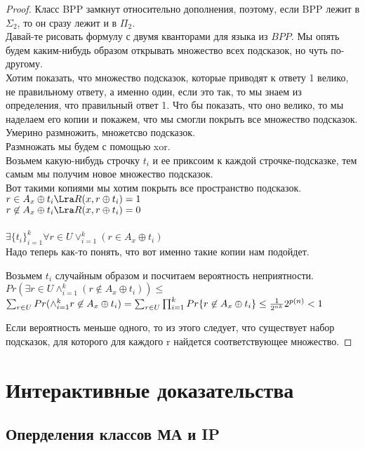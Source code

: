 \begin{proof}
	Класс BPP замкнут относительно дополнения, поэтому, если BPP лежит в $\Sigma_2$, то он сразу лежит и в $\Pi_2$.
	\\
	Давай-те рисовать формулу с двумя кванторами для языка из $BPP$. Мы опять будем каким-нибудь образом 
	открывать множество всех подсказок, но чуть по-другому. 
	\\
	Хотим показать, что множество подсказок, которые приводят к ответу 1 велико, не правильному ответу, а именно один, если это так, 
	то мы знаем из определения, что правильный ответ 1. 
	Что бы показать, что оно велико, то мы наделаем его копии и покажем, что мы смогли покрыть все множество подсказок. 
	Умерино размножить,  множетсво подсказок. 
	\\
	Размножать мы будем с помощью xor.
	\\
	Возьмем какую-нибудь строчку $t_i$ и ее приксоим к каждой строчке-подсказке, тем самым мы получим новое множество подсказок.
        \\
	Вот такими копиями мы хотим покрыть все пространство подсказок.\\
	$r \in A_x \oplus t_i \Lra R(x, r \oplus t_i) = 1$ \\
	$r \not \in A_x \oplus t_i \Lra R(x, r \oplus t_i) = 0$\\
	\\
	$\exists\{t_i\}_{i = 1}^{k} \forall r \in U \vee_{i = 1}^{k}(r \in A_x \oplus t_i)$ \\

	Надо теперь как-то понять, что вот именно такие копии нам подойдет.

	Возьмем $t_i$ случайным образом и посчитаем вероятность неприятности.
	$Pr(\exists r\in U \wedge_{i = 1}^{k}(r \not \in A_x \oplus t_i)) \le$\\
	$\sum_{r \in U}Pr(\wedge_{i = 1}^{k}r \not \in A_x \oplus t_i) = 
	\sum_{r \in U} \prod_{i = 1}^{k}Pr\{r \not \in A_x \oplus t_i\}\\
	\le \frac{1}{2^{nk}}2^{p(n)} < 1$

       Если вероятность меньше одного, то из этого следует, что существует набор подсказок, для которого 
       для каждого r найдется соответствующее множество. 
\end{proof}


\section{Интерактивные доказательства}
\subsection{Оперделения классов МА и IP}

